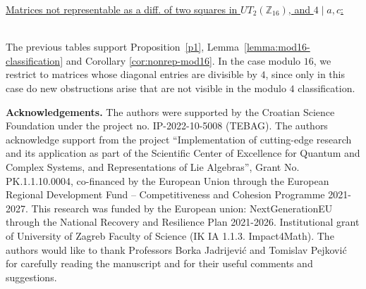 \documentclass[11pt]{amsart}
\def\Z{\mathbb{Z}}
\begin{document}
\noindent\underline{Matrices not representable as a diff. of two squares in $UT_2(\Z_{16})$, and $4\mid a,c$:}

{
}\\

The previous tables  support 
Proposition~\ref{p1}, Lemma~\ref{lemma:mod16-classification} and Corollary \ref{cor:nonrep-mod16}.  In the case modulo $16$, we restrict to matrices whose diagonal entries are divisible by $4$,   since only in this case do new obstructions arise that are not visible in the modulo $4$ classification.
  

\textbf{Acknowledgements.} The authors were supported by the Croatian Science Foundation under the
project no. IP-2022-10-5008 (TEBAG). The authors acknowledge support from the
project “Implementation of cutting-edge research and its application as part of the
Scientific Center of Excellence for Quantum and Complex Systems, and Representations of Lie Algebras”, Grant No. PK.1.1.10.0004, co-financed by the European
Union through the European Regional Development Fund – Competitiveness and
Cohesion Programme 2021-2027. This research was funded by the European union:
NextGenerationEU through the National Recovery and Resilience Plan 2021-2026. Institutional grant of University of Zagreb Faculty of Science (IK IA 1.1.3. Impact4Math).  The authors would like to thank Professors Borka Jadrijevi\' c and Tomislav Pejkovi\' c  for carefully reading the manuscript and for their useful comments and suggestions.
\end{document}

